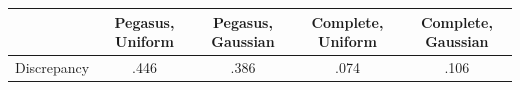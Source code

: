 \documentclass[12pt]{article}
\newcommand{\1}{\mathbf{1}}
\theoremstyle{remark}
\theoremstyle{definition}
\theoremstyle{proposition}
\theoremstyle{lemma}
\theoremstyle{definition}
\begin{document}
	\begin{figure}[!htbp]
		\centering
		 \\
		 \\
	\end{figure}


\begin{center}
\begin{tabular}{c|c|c|c|c}
	& Pegasus, Uniform & Pegasus, Gaussian & Complete, Uniform & Complete, Gaussian \\
	\hline
	Discrepancy & .446 &   .386 & .074 & .106 \\
	\end{tabular}
\end{center}
	
	 
	
	
	
\end{document}
